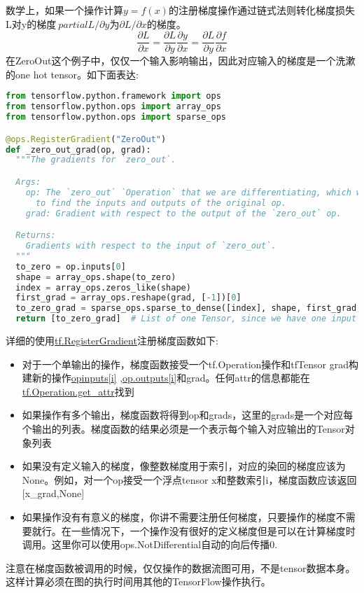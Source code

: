 数学上，如果一个操作计算$y=f(x)$的注册梯度操作通过链式法则转化梯度损失L对y的梯度$\
partial L/\partial y$为$\partial L/\partial x$的梯度。
\[\frac{\partial L}{\partial x} = \frac{\partial L}{\partial y}\frac{\partial y}{\partial x}=\frac{\partial L}{\partial y}\frac{\partial f}{\partial x}\]
在ZeroOut这个例子中，仅仅一个输入影响输出，因此对应输入的梯度是一个洗漱的one hot tensor。如下面表达:
\begin{lstlisting}[language=Python]
from tensorflow.python.framework import ops
from tensorflow.python.ops import array_ops
from tensorflow.python.ops import sparse_ops

@ops.RegisterGradient("ZeroOut")
def _zero_out_grad(op, grad):
  """The gradients for `zero_out`.

  Args:
    op: The `zero_out` `Operation` that we are differentiating, which we can use
      to find the inputs and outputs of the original op.
    grad: Gradient with respect to the output of the `zero_out` op.

  Returns:
    Gradients with respect to the input of `zero_out`.
  """
  to_zero = op.inputs[0]
  shape = array_ops.shape(to_zero)
  index = array_ops.zeros_like(shape)
  first_grad = array_ops.reshape(grad, [-1])[0]
  to_zero_grad = sparse_ops.sparse_to_dense([index], shape, first_grad, 0)
  return [to_zero_grad]  # List of one Tensor, since we have one input

\end{lstlisting}
详细的使用\href{https://www.tensorflow.org/api_docs/python/tf/RegisterGradient?hl=zh-cn}{tf.RegisterGradient}注册梯度函数如下:
\begin{itemize}
	\item 对于一个单输出的操作，梯度函数接受一个tf.Operation操作和tfTensor grad构建新的操作\href{https://www.tensorflow.org/api_docs/python/framework?hl=zh-cn#Operation.inputs}{opinputs[i]} ,\href{https://www.tensorflow.org/api_docs/python/framework?hl=zh-cn#Operation.outputs}{op.outputs[i]}和grad。任何attr的信息都能在\href{https://www.tensorflow.org/api_docs/python/tf/Operation?hl=zh-cn#get_attr}{tf.Operation.get_attr}找到
	\item 如果操作有多个输出，梯度函数将得到op和grads，这里的grads是一个对应每个输出的列表。梯度函数的结果必须是一个表示每个输入对应输出的Tensor对象列表
	\item 如果没有定义输入的梯度，像整数梯度用于索引，对应的染回的梯度应该为None。例如，对一个op接受一个浮点tensor x和整数索引i，梯度函数应该返回[x\_grad,None]
	\item 如果操作没有有意义的梯度，你讲不需要注册任何梯度，只要操作的梯度不需要就行。在一些情况下，一个操作没有很好的定义梯度但是可以在计算梯度时调用。这里你可以使用ops.NotDifferential自动的向后传播0.
\end{itemize}
注意在梯度函数被调用的时候，仅仅操作的数据流图可用，不是tensor数据本身。这样计算必须在图的执行时间用其他的TensorFlow操作执行。
